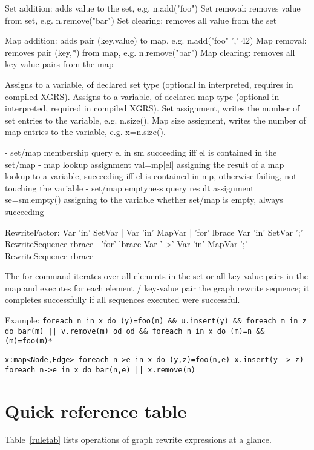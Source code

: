 Set addition: adds value to the set, e.g. n.add("foo")
Set removal: removes value from set, e.g. n.remove("bar")
Set clearing: removes all value from the set

Map addition: adds pair (key,value) to map, e.g. n.add("foo" ',' 42)
Map removal: removes pair (key,*) from map, e.g. n.remove("bar")
Map clearing: removes all key-value-pairs from the map

Assigns to a variable, of declared set type (optional in interpreted, requires in compiled XGRS).
Assigns to a variable, of declared map type (optional in interpreted, required in compiled XGRS).
Set assignment, writes the number of set entries to the variable, e.g. n.size().
Map size assigment, writes the number of map entries to the variable, e.g. x=n.size().

- set/map membership query el in sm succeeding iff el is contained in the set/map
- map lookup assignment val=mp[el] assigning the result of a map lookup to a variable, 
     succeeding iff el is contained in mp, otherwise failing, not touching the variable
- set/map emptyness query result assignment se=sm.empty() assigning to the variable 
     whether set/map is empty, always succeeding

\begin{rail}
  RewriteFactor:
    Var 'in' SetVar |
    Var 'in' MapVar |
    'for' lbrace Var 'in' SetVar ';' RewriteSequence rbrace |
    'for' lbrace Var '->' Var 'in' MapVar ';' RewriteSequence rbrace
\end{rail}
The for command iterates over all elements in the set or all key-value pairs in the map and executes for each element / key-value pair the graph rewrite sequence; it completes successfully if all sequences executed were successful.

Example:
\verb#foreach n in x do (y)=foo(n) && u.insert(y) && foreach m in z do bar(m) || v.remove(m) od od && foreach n in x do (m)=n && (m)=foo(m)*#

\verb#x:map<Node,Edge> foreach n->e in x do (y,z)=foo(n,e) x.insert(y -> z) foreach n->e in x do bar(n,e) || x.remove(n)#

\section{Quick reference table}

Table~\ref{ruletab} lists operations of graph rewrite expressions at a glance.

